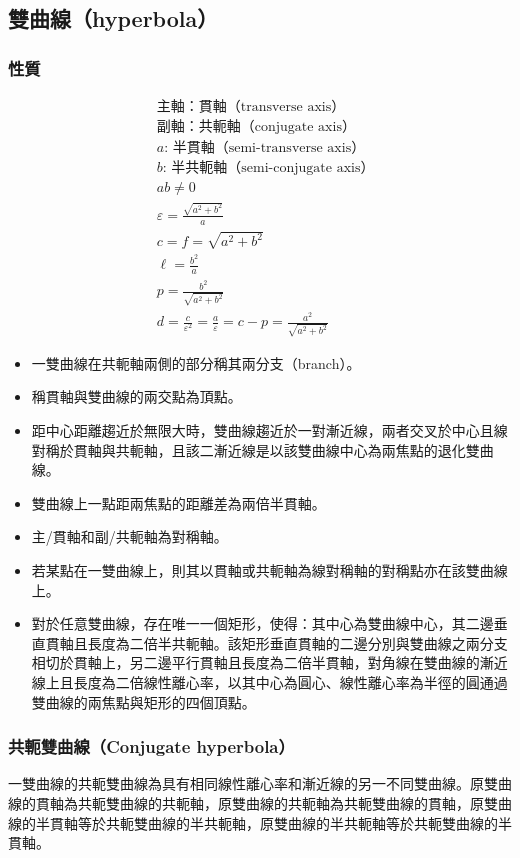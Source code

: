 \documentclass[a4paper,12pt]{article}
\begin{document}
\subsection{雙曲線（hyperbola）}
\subsubsection{性質}
\[\begin{aligned}
&\text{主軸：貫軸（transverse axis）}\\
&\text{副軸：共軛軸（conjugate axis）}\\
&a:\,\text{半貫軸（semi-transverse axis）}\\
&b:\,\text{半共軛軸（semi-conjugate axis）}\\
&ab\neq 0\\
&\varepsilon=\frac{\sqrt{a^2+b^2}}{a}\\
&c=f=\sqrt{a^2+b^2}\\
&\ell=\frac{b^2}{a}\\
&p=\frac{b^2}{\sqrt{a^2+b^2}}\\
&d=\frac{c}{\varepsilon^2}=\frac{a}{\varepsilon}=c-p=\frac{a^2}{\sqrt{a^2+b^2}}
\end{aligned}\]
\begin{itemize}
\item 一雙曲線在共軛軸兩側的部分稱其兩分支（branch）。
\item 稱貫軸與雙曲線的兩交點為頂點。
\item 距中心距離趨近於無限大時，雙曲線趨近於一對漸近線，兩者交叉於中心且線對稱於貫軸與共軛軸，且該二漸近線是以該雙曲線中心為兩焦點的退化雙曲線。
\item 雙曲線上一點距兩焦點的距離差為兩倍半貫軸。
\item 主/貫軸和副/共軛軸為對稱軸。
\item 若某點在一雙曲線上，則其以貫軸或共軛軸為線對稱軸的對稱點亦在該雙曲線上。
\item 對於任意雙曲線，存在唯一一個矩形，使得：其中心為雙曲線中心，其二邊垂直貫軸且長度為二倍半共軛軸。該矩形垂直貫軸的二邊分別與雙曲線之兩分支相切於貫軸上，另二邊平行貫軸且長度為二倍半貫軸，對角線在雙曲線的漸近線上且長度為二倍線性離心率，以其中心為圓心、線性離心率為半徑的圓通過雙曲線的兩焦點與矩形的四個頂點。
\end{itemize}
\subsubsection{共軛雙曲線（Conjugate hyperbola）}
一雙曲線的共軛雙曲線為具有相同線性離心率和漸近線的另一不同雙曲線。原雙曲線的貫軸為共軛雙曲線的共軛軸，原雙曲線的共軛軸為共軛雙曲線的貫軸，原雙曲線的半貫軸等於共軛雙曲線的半共軛軸，原雙曲線的半共軛軸等於共軛雙曲線的半貫軸。
\end{document}
